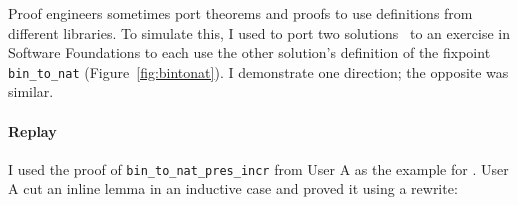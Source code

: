 \begin{figure*}
\begin{minipage}{0.49\textwidth}
\vspace{-0.42cm}
\vspace{-0.42cm}
\vspace{-0.42cm}
\vspace{-0.42cm}

\end{minipage}
\hfill
\begin{minipage}{0.49\textwidth}
\vspace{-0.42cm}
\vspace{-0.42cm}
\vspace{-0.42cm}
\vspace{-0.42cm}

\end{minipage}
\caption[Caption for LOF]{Definitions of \lstinline{bin_to_nat} for Users A (left) and B (right). Note that \lstinline{bin_to_nat} uses fixpoints
rather than , unlike most terms in this thesis.}
\label{fig:bintonat}
\end{figure*}

Proof engineers sometimes port theorems and proofs to use definitions from different libraries.
To simulate this, I used \sysname to port two solutions~\cite{usera, userb}
to an exercise in Software Foundations to each use the other solution's definition of the fixpoint \lstinline{bin_to_nat} (Figure~\ref{fig:bintonat}).
I demonstrate one direction; the opposite was similar.

\paragraph{Replay} I used the proof of \lstinline{bin_to_nat_pres_incr} from User A as the example for \sysname.
User A cut an inline lemma in an inductive case and proved it using a rewrite:

